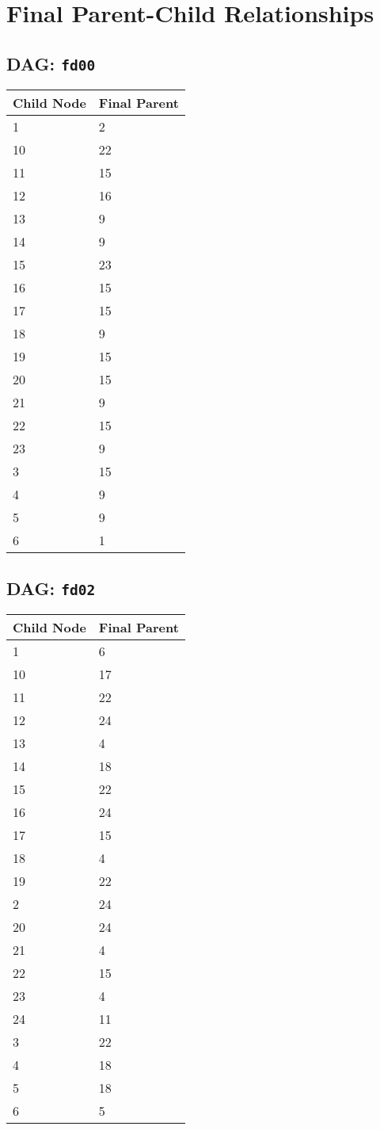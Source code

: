 \documentclass{article}
\begin{document}
\pagestyle{fancy}
\fancyhf{}
\section*{Final Parent-Child Relationships}
\subsection*{DAG: \texttt{fd00}}
\begin{tabular}{ll}
\toprule
\textbf{Child Node} & \textbf{Final Parent} \\
\midrule
1 & 2 \\
10 & 22 \\
11 & 15 \\
12 & 16 \\
13 & 9 \\
14 & 9 \\
15 & 23 \\
16 & 15 \\
17 & 15 \\
18 & 9 \\
19 & 15 \\
20 & 15 \\
21 & 9 \\
22 & 15 \\
23 & 9 \\
3 & 15 \\
4 & 9 \\
5 & 9 \\
6 & 1 \\
\bottomrule
\end{tabular}

\subsection*{DAG: \texttt{fd02}}
\begin{tabular}{ll}
\toprule
\textbf{Child Node} & \textbf{Final Parent} \\
\midrule
1 & 6 \\
10 & 17 \\
11 & 22 \\
12 & 24 \\
13 & 4 \\
14 & 18 \\
15 & 22 \\
16 & 24 \\
17 & 15 \\
18 & 4 \\
19 & 22 \\
2 & 24 \\
20 & 24 \\
21 & 4 \\
22 & 15 \\
23 & 4 \\
24 & 11 \\
3 & 22 \\
4 & 18 \\
5 & 18 \\
6 & 5 \\
\bottomrule
\end{tabular}
\end{document}
